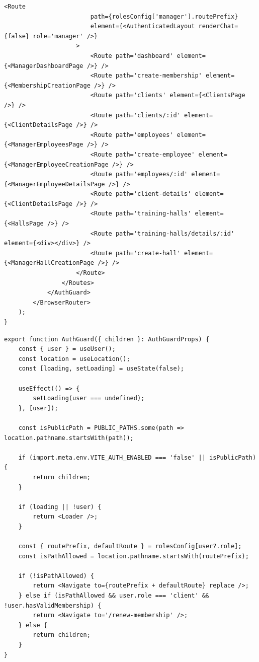\documentclass[../../spr.tex]{subfiles}
\begin{document}
\begin{lstlisting}[caption=Komponent realizujący \textit{routing} w aplikacji. Definiuje ścieżki i komponenty generujące poszczególne ekrany.]
                    <Route
                        path={rolesConfig['manager'].routePrefix}
                        element={<AuthenticatedLayout renderChat={false} role='manager' />}
                    >
                        <Route path='dashboard' element={<ManagerDashboardPage />} />
                        <Route path='create-membership' element={<MembershipCreationPage />} />
                        <Route path='clients' element={<ClientsPage />} />
                        <Route path='clients/:id' element={<ClientDetailsPage />} />
                        <Route path='employees' element={<ManagerEmployeesPage />} />
                        <Route path='create-employee' element={<ManagerEmployeeCreationPage />} />
                        <Route path='employees/:id' element={<ManagerEmployeeDetailsPage />} />
                        <Route path='client-details' element={<ClientDetailsPage />} />
                        <Route path='training-halls' element={<HallsPage />} />
                        <Route path='training-halls/details/:id' element={<div></div>} />
                        <Route path='create-hall' element={<ManagerHallCreationPage />} />
                    </Route>
                </Routes>
            </AuthGuard>
        </BrowserRouter>
    );
}
\end{lstlisting}

\newpage

\begin{lstlisting}[caption=Komponent chroniący podstrony - zapewnia przekierowania i wymusza logowanie użytkownika.]
export function AuthGuard({ children }: AuthGuardProps) {
    const { user } = useUser();
    const location = useLocation();
    const [loading, setLoading] = useState(false);

    useEffect(() => {
        setLoading(user === undefined);
    }, [user]);

    const isPublicPath = PUBLIC_PATHS.some(path => location.pathname.startsWith(path));

    if (import.meta.env.VITE_AUTH_ENABLED === 'false' || isPublicPath) {
        return children;
    }

    if (loading || !user) {
        return <Loader />;
    }

    const { routePrefix, defaultRoute } = rolesConfig[user?.role];
    const isPathAllowed = location.pathname.startsWith(routePrefix);

    if (!isPathAllowed) {
        return <Navigate to={routePrefix + defaultRoute} replace />;
    } else if (isPathAllowed && user.role === 'client' && !user.hasValidMembership) {
        return <Navigate to='/renew-membership' />;
    } else {
        return children;
    }
}
\end{lstlisting}
\end{document}
